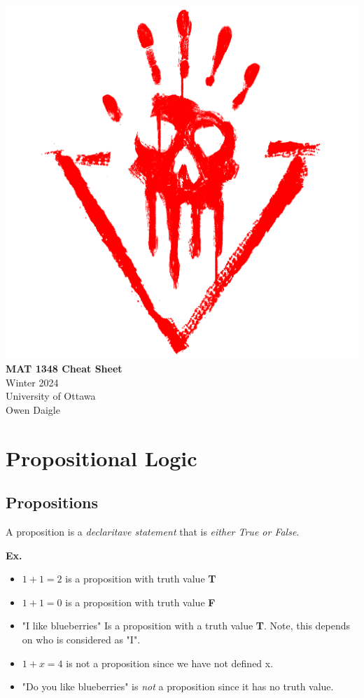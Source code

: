 \documentclass[12pt,letterpaper]{article} \usepackage{amsmath} \usepackage{graphicx}  \usepackage{longtable}  \usepackage{amssymb}
\begin{document}
    \thispagestyle{empty}
    \begin{center}
        \includegraphics[width=0.12\linewidth]{abs.png}\\
        \vspace{2em}
        \Large\textbf{MAT 1348 Cheat Sheet} \\
        \vspace{0.5em}
        \small{Winter 2024} \\
        \small{University of Ottawa} \\
        \small{Owen Daigle}
    \end{center}

    \pagebreak

    \begin{spacing}{0}
    \tableofcontents
    \end{spacing}

    \pagebreak

    \section{Propositional Logic}

        \subsection{Propositions}
        A proposition is a \emph{declaritave statement} that is \emph{either True or False}.

        \begin{mdframed}
            \textbf{Ex. }
            \begin{itemize}[noitemsep]
                \item $1+1=2$ is a proposition with truth value \textbf{T}
                \item $ 1 + 1 = 0$ is a proposition with truth value \textbf{F}
                \item "I like blueberries" Is a proposition with a truth value \textbf{T}. Note, this depends on who is considered as "I".
                \item $1+x=4$ is not a proposition since we have not defined x. 
                \item "Do you like blueberries" is \emph{not} a proposition since it has no truth value.
            \end{itemize}
        \end{mdframed}
\end{document}

